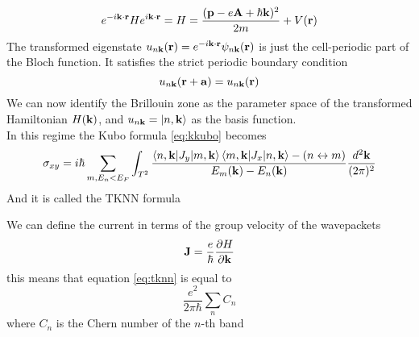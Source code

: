 \begin{equation}
    e^{-i\mathbf{k}\cdot \mathbf{r}}He^{i\mathbf{k}\cdot \mathbf{r}}= H= \frac {(\mathbf{p}-e\mathbf{A}+\hbar \mathbf{k})^2}{2m} + V(\mathbf{r})
\end{equation}
The transformed eigenstate $u_{n\mathbf{k}}(\mathbf{r})= e^{-i\mathbf{k}\cdot \mathbf{r}}\psi_{n\mathbf{k}}(\mathbf{r})$ is just the cell-periodic part of the Bloch function. It satisfies the strict periodic boundary condition 
\begin{equation}
    u_{n\mathbf{k}}(\mathbf{r}+\mathbf{a})=u_{n\mathbf{k}}(\mathbf{r})
\end{equation}
We can now identify the Brillouin zone as the parameter space of the transformed Hamiltonian $H(\mathbf{k})$, and $u_{n\mathbf{k}}=\ket{n,\mathbf{k}}$ as the basis function.\\
In this regime the Kubo formula \ref{eq:kkubo} becomes 
\begin{equation}
    \sigma_{xy}=i\hbar\sum_{m,E_n<E_F}\int_{T^2}
    \frac{
        \braket{n,\mathbf{k}|J_y}{m,\mathbf{k}}\braket{m,\mathbf{k}|J_x}{n,\mathbf{k}} - (n\leftrightarrow m)
    }
    {
        E_m(\mathbf{k})-E_n(\mathbf{k})
    }
    \frac{d^2\mathbf{k}}{(2\pi)^2}
    \label{eq:tknn}
\end{equation}
And it is called the TKNN formula \cite{thouless1982quantized}

We can define the current in terms of the group velocity of the wavepackets
\begin{equation}
    \mathbf{J}=\frac e\hbar \frac{\partial H}{\partial \mathbf{k}}
\end{equation}
this means that equation \ref{eq:tknn} is equal to
\begin{equation}
    \frac{e^2}{2\pi\hbar}\sum_{n}C_n
\end{equation}
where $C_n$ is the Chern number of the $n$-th band















